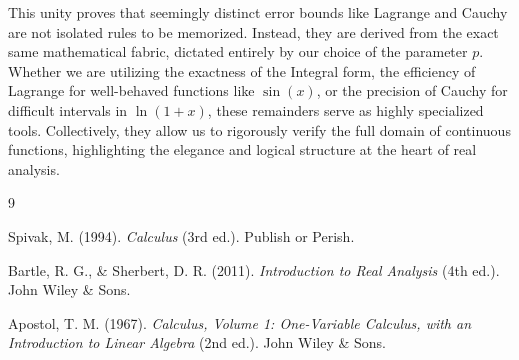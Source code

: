 \documentclass[12pt, a4paper]{article}
\theoremstyle{definition}
\theoremstyle{remark}
\begin{document}
This unity proves that seemingly distinct error bounds like Lagrange and Cauchy are not isolated rules to be memorized. Instead, they are derived from the exact same mathematical fabric, dictated entirely by our choice of the parameter $p$. Whether we are utilizing the exactness of the Integral form, the efficiency of Lagrange for well-behaved functions like $\sin(x)$, or the precision of Cauchy for difficult intervals in $\ln(1+x)$, these remainders serve as highly specialized tools. Collectively, they allow us to rigorously verify the full domain of continuous functions, highlighting the elegance and logical structure at the heart of real analysis.

\newpage

\begin{thebibliography}{9}

Spivak, M. (1994). \textit{Calculus} (3rd ed.). Publish or Perish.

Bartle, R. G., \& Sherbert, D. R. (2011). \textit{Introduction to Real Analysis} (4th ed.). John Wiley \& Sons.

Apostol, T. M. (1967). \textit{Calculus, Volume 1: One-Variable Calculus, with an Introduction to Linear Algebra} (2nd ed.). John Wiley \& Sons.

\end{thebibliography}
\end{document}
